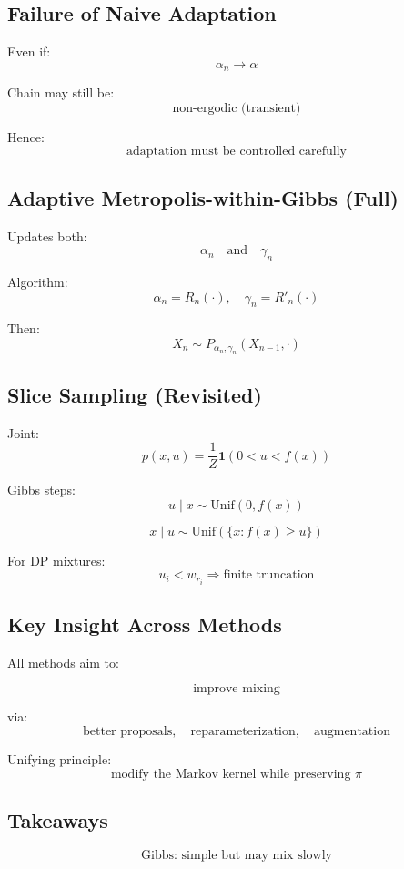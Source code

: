 \documentclass[12pt,oneside]{book}
\numberwithin{equation}{section}
\theoremstyle{definition}
\theoremstyle{plain}
\theoremstyle{remark}
\begin{document}
\subsection*{Failure of Naive Adaptation}

Even if:
\[
\alpha_n \to \alpha
\]

Chain may still be:
\[
\text{non-ergodic (transient)}
\]

Hence:
\[
\text{adaptation must be controlled carefully}
\]

\subsection{Adaptive Metropolis-within-Gibbs (Full)}

Updates both:
\[
\alpha_n \quad \text{and} \quad \gamma_n
\]

Algorithm:
\[
\alpha_n = R_n(\cdot), \quad \gamma_n = R'_n(\cdot)
\]

Then:
\[
X_n \sim P_{\alpha_n,\gamma_n}(X_{n-1}, \cdot)
\]

\subsection*{Slice Sampling (Revisited)}

Joint:
\[
p(x,u) = \frac{1}{Z} \mathbf{1}(0 < u < f(x))
\]

Gibbs steps:
\[
u \mid x \sim \text{Unif}(0, f(x))
\]

\[
x \mid u \sim \text{Unif}(\{x: f(x) \ge u\})
\]

For DP mixtures:
\[
u_i < w_{r_i}
\Rightarrow \text{finite truncation}
\]

\subsection*{Key Insight Across Methods}

All methods aim to:

\[
\text{improve mixing}
\]

via:
\[
\text{better proposals}, \quad \text{reparameterization}, \quad \text{augmentation}
\]

Unifying principle:
\[
\text{modify the Markov kernel while preserving } \pi
\]

\subsection*{Takeaways}

\[
\text{Gibbs: simple but may mix slowly}
\]
\end{document}

